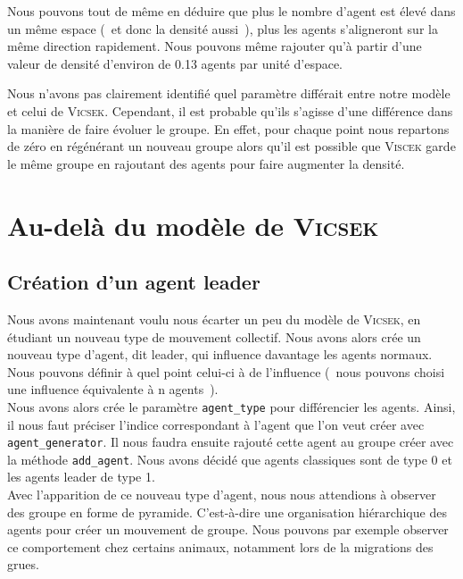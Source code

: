 \documentclass[french, a4paper, 12pt, openany]{report}
\begin{document}
	Nous pouvons tout de même en déduire que plus le nombre d'agent est élevé dans un même espace (~et donc la densité aussi~), plus les agents s'aligneront sur la même direction rapidement. Nous pouvons même rajouter qu'à partir d'une valeur de densité d'environ de 0.13 agents par unité d'espace. 
	
	Nous n'avons pas clairement identifié quel paramètre différait entre notre modèle et celui de \textsc{Vicsek}. Cependant, il est probable qu'ils s'agisse d'une différence dans la manière de faire évoluer le groupe. En effet, pour chaque point nous repartons de zéro en régénérant un nouveau groupe alors qu'il est possible que \textsc{Viscek} garde le même groupe en rajoutant des agents pour faire augmenter la densité.
    \newpage
    \section{Au-delà du modèle de \textsc{Vicsek}}
    \subsection{Création d'un agent leader}
       Nous avons maintenant voulu nous écarter un peu du modèle de \textsc{Vicsek}, en étudiant un nouveau type de mouvement collectif. Nous avons alors crée un nouveau type d'agent, dit leader, qui influence davantage les agents normaux. Nous pouvons définir à quel point celui-ci à de l'influence (~nous pouvons choisi une influence équivalente à n agents~).\\
       
       Nous avons alors crée le paramètre \verb|agent_type| pour différencier les agents. Ainsi, il nous faut préciser l'indice correspondant à l'agent que l'on veut créer avec \verb|agent_generator|. Il nous faudra ensuite rajouté cette agent au groupe créer avec la méthode \verb|add_agent|. Nous avons décidé que agents classiques sont de type 0 et les agents leader de type 1.\\
       
       Avec l'apparition de ce nouveau type d'agent, nous nous attendions à observer des groupe en forme de pyramide. C'est-à-dire une organisation hiérarchique des agents pour créer un mouvement de groupe. Nous pouvons par exemple observer ce comportement chez certains animaux, notamment lors de la migrations des grues. 
       
\end{document}
